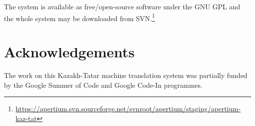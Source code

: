 \documentclass[a4paper,11pt]{article}
\begin{document}
The system is available as free/open-source software under the GNU GPL and the whole system may be downloaded
from SVN.\footnote{\url{https://apertium.svn.sourceforge.net/svnroot/apertium/staging/apertium-kaz-tat}} 

\section*{Acknowledgements}

The work on this Kazakh-Tatar machine translation system was partially funded by the Google Summer of Code and Google Code-In programmes.

%
%

%

\end{document}
